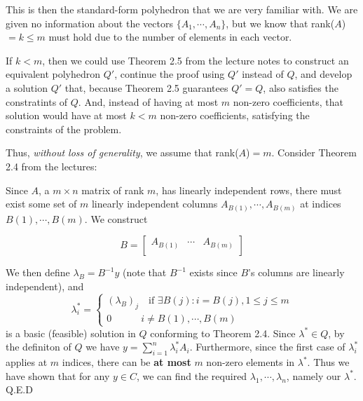 \documentclass[11pt]{article}
\begin{document}
This is then the standard-form polyhedron that we are very familiar with. We are given no information about the vectors $\{A_1,\cdots, A_n\}$, but we know that rank($A$)$=k\leq m$ must hold due to the number of elements in each vector. 

If $k<m$, then we could use Theorem 2.5 from the lecture notes to construct an equivalent polyhedron $Q'$, continue the proof using $Q'$ instead of $Q$, and develop a solution $Q'$ that, because Theorem 2.5 guarantees $Q'=Q$, also satisfies the constratints of $Q$. And, instead of having at most $m$ non-zero coefficients, that solution would have at most $k<m$ non-zero coefficients, satisfying the constraints of the problem. 

Thus, \emph{without loss of generality}, we assume that rank($A$)$=m$. Consider Theorem 2.4 from the lectures:

\bigskip

\noindent{}

Since $A$, a $m\times n$ matrix of rank $m$, has linearly independent rows, there must exist some set of $m$ linearly independent columns $A_{B(1)},\cdots, A_{B(m)}$ at indices $B(1),\cdots, B(m)$. We construct

$$
B=\begin{bmatrix}
A_{B(1)} & \cdots & A_{B(m)} \\
\end{bmatrix}
$$

We then define $\lambda_B=B^{-1}y$ (note that $B^{-1}$ exists since $B$'s columns are linearly independent), and
$$
\lambda_i^* = \begin{cases}
(\lambda_B)_j\quad \text{if }\exists B(j):i=B(j), 1\leq j\leq m\\
0\quad\quad\quad i\neq B(1), \cdots, B(m)
\end{cases}
$$
is a basic (feasible) solution in $Q$ conforming to Theorem 2.4. Since $\lambda^*\in Q$, by the definiton of $Q$ we have $y=\sum_{i=1}^n\lambda_i^*A_i$. Furthermore, since the first case of $\lambda_i^*$ applies at $m$ indices, there can be \textbf{at most} $m$ non-zero elements in $\lambda^*$. Thus we have shown that for any $y\in C$, we can find the required $\lambda_1,\cdots, \lambda_n$, namely our $\lambda^*$. Q.E.D
\end{document}

